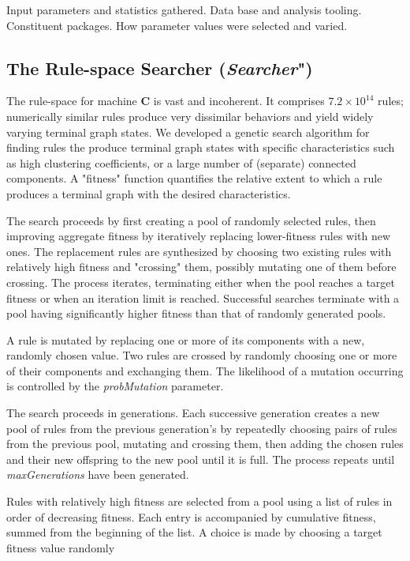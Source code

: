 \documentclass{tufte-handout}
\begin{document}
Input parameters and statistics gathered. Data base and analysis tooling.
Constituent packages. How parameter values were selected and varied.


\subsection{The Rule-space Searcher (\textit{Searcher}")}

The rule-space for machine \textbf{C} is vast and incoherent. It comprises
$7.2 \times 10^{14}$ rules; numerically similar rules produce
very dissimilar behaviors and yield widely varying terminal graph states.
We developed a genetic search algorithm for finding rules the produce terminal
graph states with specific characteristics such as high clustering coefficients, or
a large number of (separate) connected components. A "fitness" function
quantifies the relative extent to which a rule produces a terminal graph
with the desired characteristics.

The search proceeds by first creating a pool of randomly selected rules, then
improving aggregate fitness by iteratively replacing lower-fitness rules
with new ones. The replacement rules are synthesized by
choosing two existing rules with relatively high fitness and "crossing" them,
possibly mutating one of them before crossing. The process iterates, terminating
either when the pool reaches a target fitness or when an iteration limit
is reached. Successful searches terminate with a pool having significantly
higher fitness than that of randomly generated pools.

A rule is mutated by replacing one or more of its components with a new,
randomly chosen value. Two rules are crossed by randomly choosing one or
more of their components and exchanging them. The likelihood of a mutation
occurring is controlled by the \textit{probMutation} parameter.

The search proceeds in generations. Each successive generation creates a new
pool of rules from the previous generation's by repeatedly choosing pairs
of rules from the previous pool, mutating and crossing them, then adding
the chosen rules and their new offspring to the new pool until
it is full. The process repeats until \textit{maxGenerations} have been
generated.

Rules with relatively high fitness are selected from a pool using
a list of rules in order of decreasing fitness. Each entry
is accompanied by cumulative fitness, summed from the beginning
of the list. A choice is made by choosing a target fitness value
randomly
\end{document}
